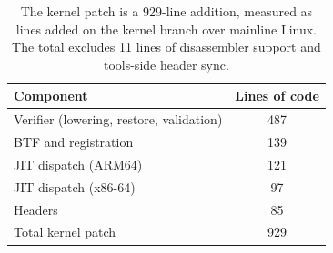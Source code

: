 \begin{table}[t]
\centering
\small
\caption{The kernel patch is a 929-line addition, measured as lines added on the \tool kernel branch over mainline Linux. The total excludes 11 lines of disassembler support and tools-side header sync.}
\label{tab:kernel-loc}
\begin{tabular}{@{}lc@{}}
\toprule
Component & Lines of code \\
\midrule
Verifier (lowering, restore, validation) & 487 \\
BTF and registration & 139 \\
JIT dispatch (ARM64) & 121 \\
JIT dispatch (x86-64) & 97 \\
Headers & 85 \\
\midrule
Total kernel patch & 929 \\
\bottomrule
\end{tabular}
\end{table}